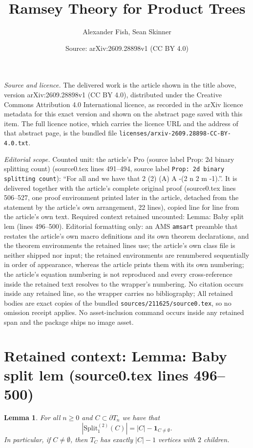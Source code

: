\documentclass[10pt,a4paper]{amsart}
\title[Ramsey Theory for Product Trees]{Ramsey Theory for Product Trees}
\author{Alexander Fish, Sean Skinner}
\date{Source: arXiv:2609.28898v1 (CC BY 4.0)}
\newcommand{\Split}{\mathrm{Split}}
\newcommand\labs[1]{\left\lvert#1\right\rvert}
\theoremstyle{plain}
\newtheorem{lem}[thm]{Lemma}
\theoremstyle{definition}
\theoremstyle{remark}
\begin{document}
\maketitle

\noindent\emph{Source and licence.} The delivered work is the article shown in the title above, version arXiv:2609.28898v1 (CC BY 4.0), distributed under the Creative Commons Attribution 4.0 International licence, as recorded in the arXiv licence metadata for this exact version and shown on the abstract page saved with this item. The full licence notice, which carries the licence URL and the address of that abstract page, is the bundled file \texttt{licenses/arxiv-2609.28898-CC-BY-4.0.txt}.
\par\smallskip

\noindent\textit{Editorial scope.} Counted unit: the article's Pro (source label Prop: 2d binary splitting count) (source0.tex lines 491--494, source label \texttt{Prop: 2d binary splitting count}): ``For all and we have that 2 (2) (A) A -(2 n 2 m -1).''. It is delivered together with the article's complete original proof (source0.tex lines 506--527, one proof environment printed later in the article, detached from the statement by the article's own arrangement, 22 lines), copied line for line from the article's own text. Required context retained uncounted: Lemma: Baby split lem (lines 496--500). Editorial formatting only: an AMS \texttt{amsart} preamble that restates the article's own macro definitions and its own theorem declarations, and the theorem environments the retained lines use; the article's own class file is neither shipped nor input; the retained environments are renumbered sequentially in order of appearance, whereas the article prints them with its own numbering; the article's equation numbering is not reproduced and every cross-reference inside the retained text resolves to the wrapper's numbering. No citation occurs inside any retained line, so the wrapper carries no bibliography; All retained bodies are exact copies of the bundled \texttt{sources/211625/source0.tex}, so no omission receipt applies. No asset-inclusion command occurs inside any retained span and the package ships no image asset.


\section*{Retained context: Lemma: Baby split lem (source0.tex lines 496--500)}

\begin{lem}\label{Lemma: Baby split lem}
For all $n\geq 0$ and $C\subset \partial T_n$ we have that
\[ \labs{\Split_1^{(2)}(C)} = \labs{C} - \mathbf{1}_{C\neq \emptyset}.\]
In particular, if $C\neq \emptyset$, then $T_C$ has exactly $\labs{C}-1$ vertices with $2$ children.
\end{lem}
\end{document}
